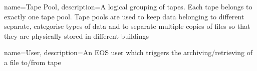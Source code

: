 {
  name={Tape Pool},
  description={A logical grouping of tapes. Each tape belongs to exactly one tape pool. Tape pools are used to keep
    data belonging to different  separate, categorise types of data and to separate multiple copies of files
    so that they are physically stored in different buildings}
}

{
  name={User},
  description={An EOS user which triggers the archiving\slash retrieving of a file to\slash from tape}
}


\printglossaries


\glsresetall
